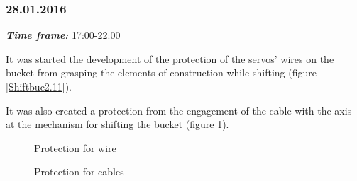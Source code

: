 \subsubsection{28.01.2016}
\textit{\textbf{Time frame:}} 17:00-22:00 

It was started the development of the protection of the servos' wires on the bucket from grasping the elements of construction while shifting (figure \ref{Shiftbuc2.11}).

It was also created a protection from the engagement of the cable with the axis at the mechanism for shifting the bucket (figure \ref{Shiftbuc2.12}).

\begin{figure}[H]
	\begin{minipage}[h]{0.47\linewidth}
		\caption{Protection for wire}
		\label{Shiftbuc2.11}
	\end{minipage}
	\hfill
	\begin{minipage}[h]{0.47\linewidth}
		\caption{Protection for cables}
		\label{Shiftbuc2.12}
	\end{minipage}
\end{figure}

